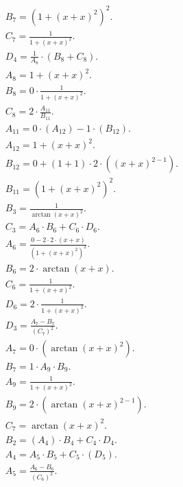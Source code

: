 \documentclass[12pt,a4paper]{extreport}
\begin{document}
\begin{multline}
\\
B_{7} = (1 + (x + x) ^ {2}) ^ {2}.\\
C_{7} = \frac{1}{1 + (x + x) ^ {2}}.\\
D_{4} = \frac{1}{A_{8}} \cdot (B_{8} + C_{8}).\\
A_{8} = 1 + (x + x) ^ {2}.\\
B_{8} = 0 \cdot \frac{1}{1 + (x + x) ^ {2}}.\\
C_{8} = 2 \cdot \frac{A_{11}}{B_{11}}.\\
A_{11} = 0 \cdot (A_{12}) - 1 \cdot (B_{12}).\\
A_{12} = 1 + (x + x) ^ {2}.\\
B_{12} = 0 + (1 + 1) \cdot 2 \cdot ((x + x) ^ {2 - 1}).\\
B_{11} = (1 + (x + x) ^ {2}) ^ {2}.\\
B_{3} = \frac{1}{\arctan(x + x) ^ {2}}.\\
C_{3} = A_{6} \cdot B_{6} + C_{6} \cdot D_{6}.\\
A_{6} = \frac{0 - 2 \cdot 2 \cdot (x + x)}{(1 + (x + x) ^ {2}) ^ {2}}.\\
B_{6} = 2 \cdot \arctan(x + x).\\
C_{6} = \frac{1}{1 + (x + x) ^ {2}}.\\
D_{6} = 2 \cdot \frac{1}{1 + (x + x) ^ {2}}.\\
D_{3} = \frac{A_{7} - B_{7}}{(C_{7}) ^ {2}}.\\
A_{7} = 0 \cdot (\arctan(x + x) ^ {2}).\\
B_{7} = 1 \cdot A_{9} \cdot B_{9}.\\
A_{9} = \frac{1}{1 + (x + x) ^ {2}}.\\
B_{9} = 2 \cdot (\arctan(x + x) ^ {2 - 1}).\\
C_{7} = \arctan(x + x) ^ {2}.\\
B_{2} = (A_{4}) \cdot B_{4} + C_{4} \cdot D_{4}.\\
A_{4} = A_{5} \cdot B_{5} + C_{5} \cdot (D_{5}).\\
A_{5} = \frac{A_{6} - B_{6}}{(C_{6}) ^ {2}}.\\
\end{multline}
\end{document}

